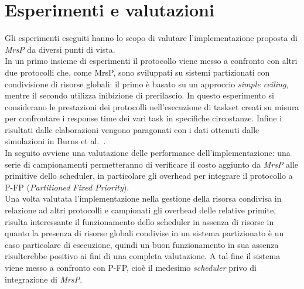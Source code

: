 








\section{Esperimenti e valutazioni}
\label{sec:esperimenti}

\noindent Gli esperimenti eseguiti hanno lo scopo di valutare l'implementazione proposta di \emph{MrsP} da diversi punti di vista.\\

\noindent In un primo insieme di esperimenti il protocollo viene messo a confronto con altri due protocolli che, come MrsP, sono sviluppati su sistemi partizionati con condivisione di risorse globali: il primo è basato su un approccio \textit{simple ceiling}, mentre il secondo utilizza inibizione di prerilascio. In questo esperimento si considerano le prestazioni dei protocolli nell'esecuzione di taskset creati su misura per confrontare i response time dei vari task in specifiche circostanze. Infine i risultati dalle elaborazioni vengono paragonati con i dati ottenuti dalle simulazioni in Burns et al.~\cite{Burns:2013:SCM:2547348.2547350}.\\

\noindent In seguito avviene una valutazione delle performance dell'implementazione: una serie di campionamenti permetteranno di verificare il costo aggiunto da \textit{MrsP} alle primitive dello scheduler, in particolare gli overhead per integrare il protocollo a P-FP (\textit{Partitioned Fixed Priority}).\\

\noindent Una volta valutata l'implementazione nella gestione della risorsa condivisa in relazione ad altri protocolli e campionati gli overhead delle relative primite, risulta interessante il funzionamento dello scheduler in assenza di risorse in quanto la presenza di risorse globali condivise in un sistema partizionato è un caso particolare di esecuzione, quindi un buon funzionamento in sua assenza risulterebbe positivo ai fini di una completa valutazione. A tal fine il sistema viene messo a confronto con P-FP, cioè il medesimo \textit{scheduler} privo di integrazione di \textit{MrsP}.\\

